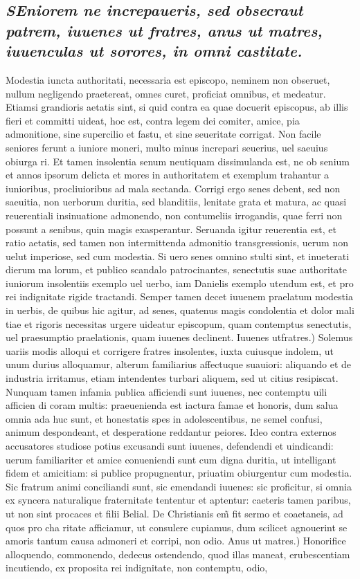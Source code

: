 \documentclass{article}
\begin{document}
\begin{pages}
\subsection*{\textit{\huge\textbf{S}\normalsize Eniorem ne increpaueris, sed obsecraut patrem, iuuenes ut fratres, anus ut matres, iuuenculas ut sorores, in omni castitate. }}\pstart Modestia iuncta authoritati, necessaria est episcopo, neminem non obseruet, nullum negligendo praetereat, omnes curet, proficiat omnibus, et medeatur. Etiamsi grandioris aetatis sint, si quid contra ea quae docuerit episcopus, ab illis fieri et committi uideat, hoc est, contra legem dei comiter, amice, pia admonitione, sine supercilio et fastu, et sine seueritate corrigat. Non facile seniores ferunt a iuniore moneri, multo minus increpari seuerius, uel saeuius obiurga ri. Et tamen insolentia senum neutiquam dissimulanda est, ne ob senium et annos ipsorum delicta et mores in authoritatem et exemplum trahantur a iunioribus, procliuioribus ad mala sectanda. Corrigi ergo senes debent, sed non saeuitia, non uerborum duritia, sed blanditiis, lenitate grata et matura, ac quasi reuerentiali insinuatione admonendo, non contumeliis irrogandis, quae ferri non possunt a senibus, quin magis exasperantur. Seruanda igitur reuerentia est, et ratio aetatis, sed tamen non intermittenda admonitio transgressionis, uerum non uelut imperiose, sed cum modestia. Si uero senes omnino stulti sint, et inueterati dierum ma lorum, et publico scandalo patrocinantes, senectutis suae authoritate iuniorum insolentiis exemplo uel uerbo, iam Danielis exemplo utendum est, et pro rei indignitate rigide tractandi. Semper tamen decet iuuenem praelatum modestia in uerbis, de quibus hic agitur, ad senes, quatenus magis condolentia et dolor mali tiae et rigoris necessitas urgere uideatur episcopum, quam contemptus senectutis, uel praesumptio praelationis, quam iuuenes declinent. Iuuenes utfratres.) Solemus uariis modis alloqui et corrigere fratres insolentes, iuxta cuiusque indolem, ut unum durius alloquamur, alterum familiarius affectuque suauiori: aliquando et de industria irritamus, etiam intendentes turbari aliquem, sed ut citius resipiscat. Nunquam tamen infamia publica afficiendi sunt iuuenes, nec contemptu uili afficien di coram multis: praeuenienda est iactura famae et honoris, dum salua omnia ada huc sunt, et honestatis spes in adolescentibus, ne semel confusi, animum despondeant, et desperatione reddantur peiores. Ideo contra externos accusatores studiose potius excusandi sunt iuuenes, defendendi et uindicandi: uerum familiariter et amice conueniendi sunt cum digna duritia, ut intelligant fidem et amicitiam: si publice propugnentur, priuatim obiurgentur cum modestia. Sic fratrum animi conciliandi sunt, sic emendandi iuuenes: sic proficitur, si omnia ex syncera naturalique fraternitate tententur et aptentur: caeteris tamen paribus, ut non sint procaces et filii Belial. De Christianis em̃ fit sermo et coaetaneis, ad quos pro cha ritate afficiamur, ut consulere cupiamus, dum scilicet agnouerint se amoris tantum causa admoneri et corripi, non odio. Anus ut matres.) Honorifice alloquendo, commonendo, dedecus ostendendo, quod illas maneat, erubescentiam incutiendo, ex proposita rei indignitate, non contemptu, odio, 
\end{pages}
\end{document}
